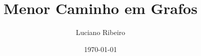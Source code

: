 \documentclass[11pt]{beamer}
\author{Luciano Ribeiro}
\title{Menor Caminho em Grafos}
\date{\today}
\begin{document}
\frame{\titlepage}


\end{document}
